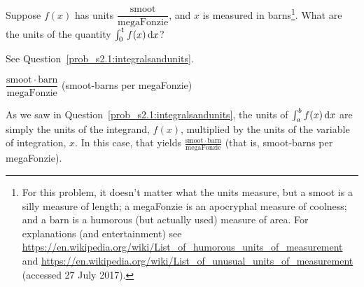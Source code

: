 \begin{Mquestion}
Suppose $f(x)$  has units $\dfrac{\mathrm{smoot}}{\mathrm{megaFonzie}}$, and $x$ is measured in barns\footnote{For this problem, it doesn't matter what the units measure, but a smoot is a silly measure of length; a megaFonzie is an apocryphal measure of coolness; and a barn is a humorous (but actually used) measure of area. For explanations (and entertainment) see \url{https://en.wikipedia.org/wiki/List_of_humorous_units_of_measurement} and \url{https://en.wikipedia.org/wiki/List_of_unusual_units_of_measurement} (accessed 27 July 2017).}. What are the units of the quantity $\int_0^1 f(x)\,\mathrm{d}x$?
\end{Mquestion}
\begin{hint}
See Question~\ref{prob_s2.1:integralsandunits}.
\end{hint}
\begin{answer}
$\dfrac{\mathrm{smoot}\cdot\mathrm{barn}}{\mathrm{megaFonzie}}$ \quad (smoot-barns per megaFonzie)
\end{answer}
\begin{solution}
As we saw in Question~\ref{prob_s2.1:integralsandunits}, the units of $\int_a^b f(x)\, \mathrm{d}x$ are simply the units of the integrand, $f(x)$, multiplied by the units of the variable of integration, $x$. In this case, that yields
$\frac{\mathrm{smoot}\cdot\mathrm{barn}}{\mathrm{megaFonzie}}$ (that is, smoot-barns per megaFonzie).

\end{solution}


